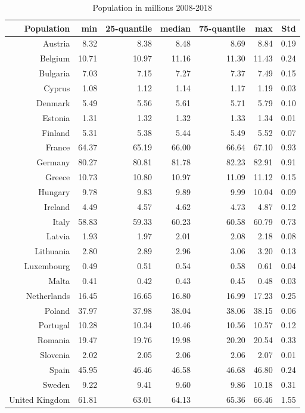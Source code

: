 \documentclass[a4paper,twoside,10pt]{article}
\begin{document}
\begin{table}[H]
	\centering
	\begin{tabular}{|r|rrrrr|r|}
		\hline
		Population & min & 25-quantile & median & 75-quantile & max & Std \\ 
		\hline
		Austria & 8.32 & 8.38 & 8.48 & 8.69 & 8.84 & 0.19 \\ 
		Belgium & 10.71 & 10.97 & 11.16 & 11.30 & 11.43 & 0.24 \\ 
		Bulgaria & 7.03 & 7.15 & 7.27 & 7.37 & 7.49 & 0.15 \\ 
		Cyprus & 1.08 & 1.12 & 1.14 & 1.17 & 1.19 & 0.03 \\ 
		Denmark & 5.49 & 5.56 & 5.61 & 5.71 & 5.79 & 0.10 \\
		\hline 
		Estonia & 1.31 & 1.32 & 1.32 & 1.33 & 1.34 & 0.01 \\ 
		Finland & 5.31 & 5.38 & 5.44 & 5.49 & 5.52 & 0.07 \\ 
		France & 64.37 & 65.19 & 66.00 & 66.64 & 67.10 & 0.93 \\ 
		Germany & 80.27 & 80.81 & 81.78 & 82.23 & 82.91 & 0.91 \\ 
		Greece & 10.73 & 10.80 & 10.97 & 11.09 & 11.12 & 0.15 \\ 
		\hline
		Hungary & 9.78 & 9.83 & 9.89 & 9.99 & 10.04 & 0.09 \\ 
		Ireland & 4.49 & 4.57 & 4.62 & 4.73 & 4.87 & 0.12 \\ 
		Italy & 58.83 & 59.33 & 60.23 & 60.58 & 60.79 & 0.73 \\ 
		Latvia & 1.93 & 1.97 & 2.01 & 2.08 & 2.18 & 0.08 \\ 
		Lithuania & 2.80 & 2.89 & 2.96 & 3.06 & 3.20 & 0.13 \\ 
		\hline
		Luxembourg & 0.49 & 0.51 & 0.54 & 0.58 & 0.61 & 0.04 \\ 
		Malta & 0.41 & 0.42 & 0.43 & 0.45 & 0.48 & 0.03 \\ 
		Netherlands & 16.45 & 16.65 & 16.80 & 16.99 & 17.23 & 0.25 \\ 
		Poland & 37.97 & 37.98 & 38.04 & 38.06 & 38.15 & 0.06 \\ 
		Portugal & 10.28 & 10.34 & 10.46 & 10.56 & 10.57 & 0.12 \\ 
		\hline
		Romania & 19.47 & 19.76 & 19.98 & 20.20 & 20.54 & 0.33 \\ 
		Slovenia & 2.02 & 2.05 & 2.06 & 2.06 & 2.07 & 0.01 \\ 
		Spain & 45.95 & 46.46 & 46.58 & 46.68 & 46.80 & 0.24 \\ 
		Sweden & 9.22 & 9.41 & 9.60 & 9.86 & 10.18 & 0.31 \\ 
		United Kingdom & 61.81 & 63.01 & 64.13 & 65.36 & 66.46 & 1.55 \\ 
		\hline
	\end{tabular}
	\caption{Population in millions 2008-2018}
	\label{population}
\end{table}
\end{document}
